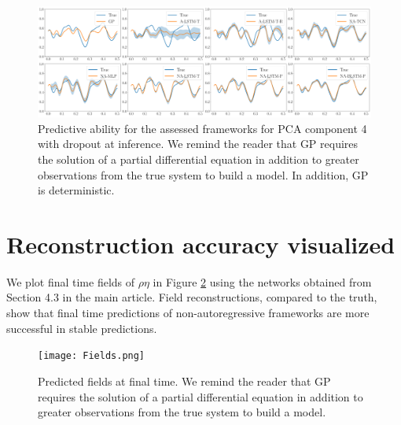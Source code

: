\documentclass[12pt]{article}
\begin{document}
\begin{figure}[h]
    \centering
    \includegraphics[width=\textwidth]{Figure_4_do.png}
    \caption{Predictive ability for the assessed frameworks for PCA component 4 with dropout at inference. We remind the reader that GP requires the solution of a partial differential equation in addition to greater observations from the true system to build a model. In addition, GP is deterministic.}
    \label{Mode_4_do}
\end{figure}

\section{Reconstruction accuracy visualized}

We plot final time fields of $\rho \eta$ in Figure \ref{Fields} using the networks obtained from Section 4.3 in the main article. Field reconstructions, compared to the truth, show that final time predictions of non-autoregressive frameworks are more successful in stable predictions.

\begin{figure}[h]
    \centering
    \texttt{[image: Fields.png]}
    \caption{Predicted fields at final time. We remind the reader that GP requires the solution of a partial differential equation in addition to greater observations from the true system to build a model.}
    \label{Fields}
\end{figure}

\small


\end{document}
